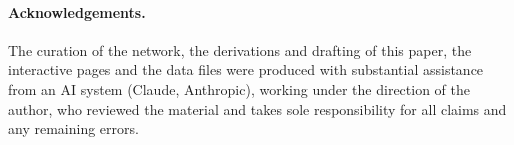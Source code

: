 \documentclass[11pt,a4paper]{article}
\theoremstyle{definition}
\begin{document}
\paragraph{Acknowledgements.} The curation of the network, the derivations
and drafting of this paper, the interactive pages and the data files were
produced with substantial assistance from an AI system (Claude, Anthropic),
working under the direction of the author, who reviewed the material and
takes sole responsibility for all claims and any remaining errors.



\end{document}
